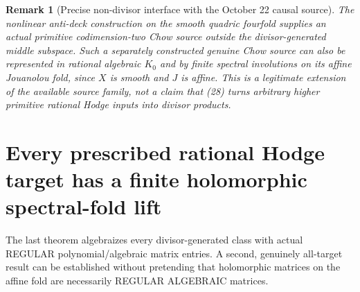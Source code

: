 \documentclass[11pt]{article}
\newtheorem{remark}[theorem]{Remark}
\begin{document}
\begin{remark}[Precise non-divisor interface with the October 22 causal source]
The nonlinear anti-deck construction on the smooth quadric
fourfold supplies an actual primitive codimension-two Chow source
outside the divisor-generated middle subspace.
Such a separately constructed genuine Chow source can also be
represented in rational algebraic $K_0$ and by finite spectral
involutions on its affine Jouanolou fold, since $X$ is smooth
and $J$ is affine. This is a legitimate \emph{extension of the
available source family}, not a claim that (28) turns arbitrary
higher primitive rational Hodge inputs into divisor products.
\end{remark}



\section{Every prescribed rational Hodge target has a finite holomorphic spectral-fold lift}
The last theorem algebraizes every divisor-generated class with actual
REGULAR polynomial/algebraic matrix entries. A second, genuinely all-target
result can be established without pretending that holomorphic matrices on
the affine fold are necessarily REGULAR ALGEBRAIC matrices.
\end{document}
